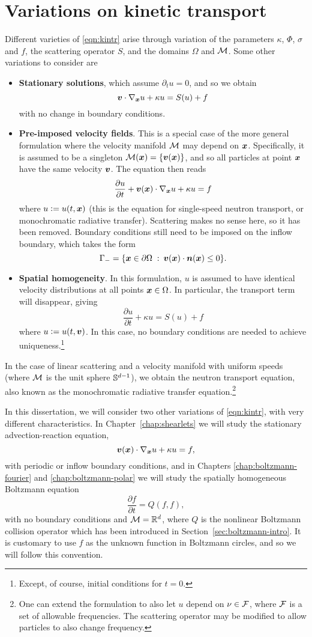 \section{Variations on kinetic transport}

Different varieties of \eqref{eqn:kintr} arise through variation of the parameters $\kappa$, $\Phi$,
$\sigma$ and $f$, the scattering operator $S$, and the domains $\Omega$ and $\mathcal{M}$. Some other variations to
consider are
\begin{itemize}
\item {\bf Stationary solutions}, which assume $\partial_t u = 0$, and so we obtain
\[
    {\bm v}\cdot\nabla_{\bm x} u + \kappa u = S(u) + f
\]
with no change in boundary conditions.
\item {\bf Pre-imposed velocity fields}. This is a special case of the more general formulation where the
velocity manifold $\mathcal{M}$ may depend on ${\bm x}$. Specifically, it is assumed to be a singleton $\mathcal{M}({\bm x}) = \{
{\bm v}({\bm x}) \}$, and so all particles at point ${\bm x}$ have the same velocity ${\bm v}$. The equation then reads
\[
    \frac{\partial u}{\partial t} + {\bm v}({\bm x})\cdot\nabla_{\bm x} u + \kappa u = f
\]
where $u \vcentcolon= u(t,{\bm x})$ (this is the equation for single-speed neutron transport, or monochromatic radiative
transfer). Scattering makes no sense here, so it has been removed. Boundary conditions still need to be
imposed on the inflow boundary, which takes the form
\[
    \Gamma_- = \{ {\bm x} \in \partial\Omega \;:\: {\bm v}({\bm x}) \cdot {\bm n}({\bm x}) \leq 0 \}.
\]
\item {\bf Spatial homogeneity}. In this formulation, $u$ is assumed to have identical velocity distributions
at all points ${\bm x}\in\Omega$. In particular, the transport term will disappear, giving
\[
    \frac{\partial u}{\partial t} + \kappa u = S(u) + f
\]
where $u \vcentcolon= u(t,{\bm v})$. In this case, no boundary conditions are needed to achieve
uniqueness.\footnote{Except, of course, initial conditions for $t=0$.}
\end{itemize}

In the case of linear scattering and a velocity manifold with uniform speeds (where $\mathcal{M}$ is the unit sphere
$\mathbb{S}^{d-1}$), we obtain the neutron transport equation, also known as the monochromatic radiative transfer
equation.\footnote{One can extend the formulation to also let $u$ depend on $\nu\in\mathcal{F}$, where $\mathcal{F}$ is a set
of allowable frequencies. The scattering operator may be modified to allow particles to also change
frequency.}

In this dissertation, we will consider two other variations of \eqref{eqn:kintr}, with very different
characteristics. In Chapter~\ref{chap:shearlets} we will study the stationary advection-reaction equation,
\[
    {\bm v}({\bm x})\cdot\nabla_{\bm x} u + \kappa u = f,
\]
with periodic or inflow boundary conditions, and in Chapters \ref{chap:boltzmann-fourier} and
\ref{chap:boltzmann-polar} we will study the spatially homogeneous Boltzmann equation
\[
    \frac{\partial f}{\partial t} = Q(f,f),
\]
with no boundary conditions and $\mathcal{M}=\mathbb{R}^d$, where $Q$ is the nonlinear Boltzmann collision operator which
has been introduced in Section~\ref{sec:boltzmann-intro}. It is customary to use $f$ as the unknown function
in Boltzmann circles, and so we will follow this convention.

